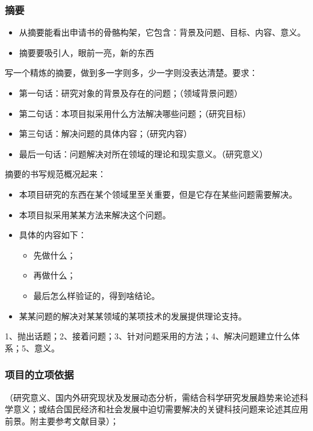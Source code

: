\subsubsection{摘要}
\begin{itemize}
\item {\color{red}从摘要能看出申请书的骨骼构架，它包含：背景及问题、目标、内容、意义。}
\item 摘要要吸引人，眼前一亮，新的东西
\end{itemize}

写一个精炼的摘要，做到多一字则多，少一字则没表达清楚。要求：
\begin{itemize}
\item 第一句话：研究对象的背景及存在的问题；（领域背景问题）
\item 第二句话：本项目拟采用什么方法解决哪些问题；（研究目标）
\item 第三句话：解决问题的具体内容；（研究内容）
\item 最后一句话：问题解决对所在领域的理论和现实意义。（研究意义）
\end{itemize}

摘要的书写规范概况起来：
\begin{itemize}
\item 本项目研究的东西在某个领域里至关重要，但是它存在某些问题需要解决。
\item 本项目拟采用某某方法来解决这个问题。
\item 具体的内容如下：
	\begin{itemize}
	\item[1)] 先做什么；
	\item[2)] 再做什么；
	\item[3)] 最后怎么样验证的，得到啥结论。
	\end{itemize}
\item 某某问题的解决对某某领域的某项技术的发展提供理论支持。
\end{itemize}

1、抛出话题；2、接着问题；3、针对问题采用的方法；4、解决问题建立什么体系；5、意义。


\subsubsection{项目的立项依据}
（研究意义、国内外研究现状及发展动态分析，需结合科学研究发展趋势来论述科学意义；或结合国民经济和社会发展中迫切需要解决的关键科技问题来论述其应用前景。附主要参考文献目录）；

